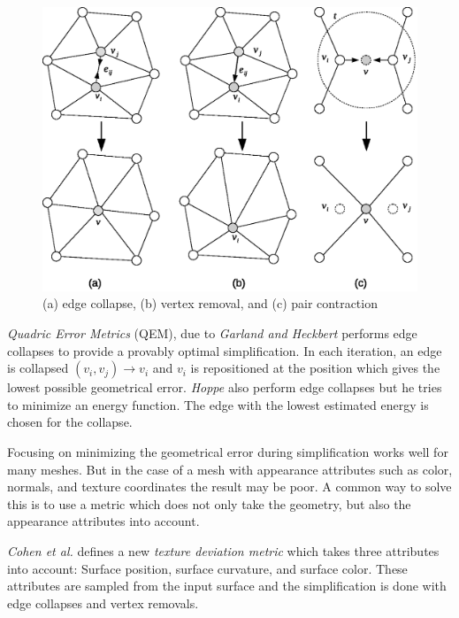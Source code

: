 \begin{figure}[ht]
    \centering
    \includegraphics[width=\textwidth]{figures/mesh_transformations.eps}
    \caption{(a) edge collapse, (b) vertex removal, and (c) pair contraction}
    \label{fig:mesh_transformations}
\end{figure}

\emph{Quadric Error Metrics} (QEM), due to \emph{Garland and Heckbert} \cite{garland1997surface} performs edge collapses to provide a provably optimal simplification. In each iteration, an edge is collapsed \((v_i, v_j) \rightarrow v_i\) and \(v_i\) is repositioned at the position which gives the lowest possible geometrical error. \emph{Hoppe} \cite{hoppe1996progressive} also perform edge collapses but he tries to minimize an energy function. The edge with the lowest estimated energy is chosen for the collapse. 


Focusing on minimizing the geometrical error during simplification works well for many meshes. But in the case of a mesh with appearance attributes such as color, normals, and texture coordinates the result may be poor. A common way to solve this is to use a metric which does not only take the geometry, but also the appearance attributes into account.

\emph{Cohen et al.} \cite{cohen1998appearance} defines a new \emph{texture deviation metric} which takes three attributes into account: Surface position, surface curvature, and surface color. These attributes are sampled from the input surface and the simplification is done with edge collapses and vertex removals.

